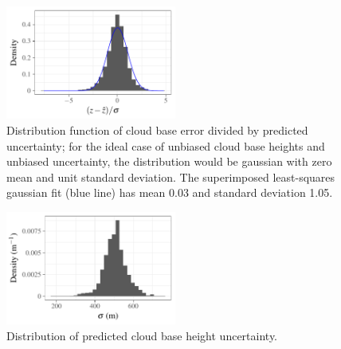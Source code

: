 \documentclass[amt,manuscript]{copernicus}\usepackage[]{graphicx}\usepackage[]{color}
\newenvironment{knitrout}{}{} %
\begin{document}
\begin{figure}
  \centering
\begin{knitrout}
\color{fgcolor}

{\centering \includegraphics[width=0.5\textwidth]{figure/method-combo-eval-pull-1} 

}



\end{knitrout}
  \caption{Distribution function of cloud base error divided by predicted
    uncertainty; for the ideal case of unbiased cloud base heights and unbiased
    uncertainty, the distribution would be gaussian with zero mean and unit
    standard deviation.  The superimposed least-squares gaussian fit (blue line)
    has mean 0.03 and
    standard deviation 1.05.}
  \label{fig:pull}
\end{figure}

\begin{figure}
  \centering
\begin{knitrout}
\color{fgcolor}

{\centering \includegraphics[width=0.5\textwidth]{figure/method-combo-eval-rmse-1} 

}



\end{knitrout}
  \caption{Distribution of predicted cloud base height uncertainty.}
  \label{fig:uncertainty}
\end{figure}

\end{document}
